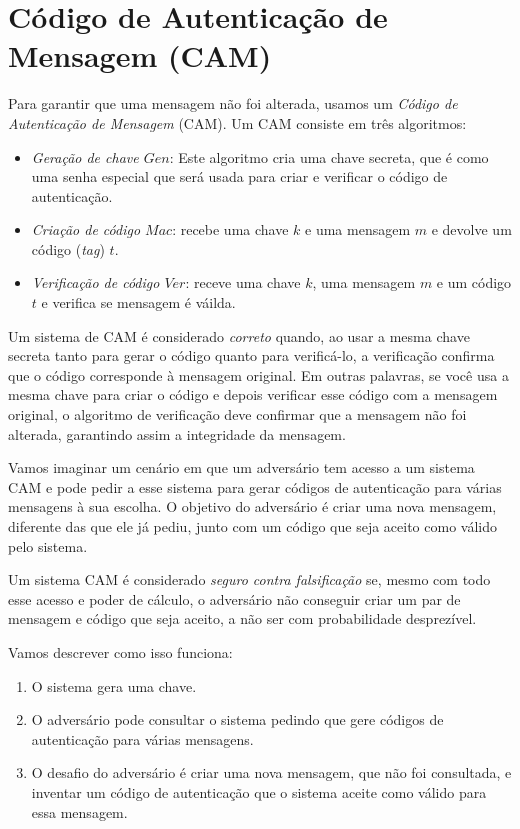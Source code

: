 \section{Código de Autenticação de Mensagem (CAM)}
\label{sec:mac}

Para garantir que uma mensagem não foi alterada, usamos um {\em Código de Autenticação de Mensagem} (CAM).
Um CAM consiste em três algoritmos:

\begin{itemize}
\item[] {\em Geração de chave $Gen$}: Este algoritmo cria uma chave secreta, que é como uma senha especial que será usada para criar e verificar o código de autenticação.
\item[] {\em Criação de código $Mac$}: recebe uma chave $k$ e uma mensagem $m$ e devolve um código ({\em tag}) $t$.
\item[] {\em Verificação de código $Ver$}: receve uma chave $k$, uma mensagem $m$ e um código $t$ e verifica se mensagem é váilda.
\end{itemize}

Um sistema de CAM é considerado {\em correto} quando, ao usar a mesma chave secreta tanto para gerar o código quanto para verificá-lo, a verificação confirma que o código corresponde à mensagem original.
Em outras palavras, se você usa a mesma chave para criar o código e depois verificar esse código com a mensagem original, o algoritmo de verificação deve confirmar que a mensagem não foi alterada, garantindo assim a integridade da mensagem.

Vamos imaginar um cenário em que um adversário tem acesso a um sistema CAM e pode pedir a esse sistema para gerar códigos de autenticação para várias mensagens à sua escolha.
O objetivo do adversário é criar uma nova mensagem, diferente das que ele já pediu, junto com um código que seja aceito como válido pelo sistema.

Um sistema CAM é considerado {\em seguro contra falsificação} se, mesmo com todo esse acesso e poder de cálculo, o adversário não conseguir criar um par de mensagem e código que seja aceito, a não ser com probabilidade desprezível.

Vamos descrever como isso funciona:
\begin{enumerate}
\item O sistema gera uma chave.
\item O adversário pode consultar o sistema pedindo que gere códigos de autenticação para várias mensagens.
\item O desafio do adversário é criar uma nova mensagem, que não foi consultada, e inventar um código de autenticação que o sistema aceite como válido para essa mensagem.
\end{enumerate}

